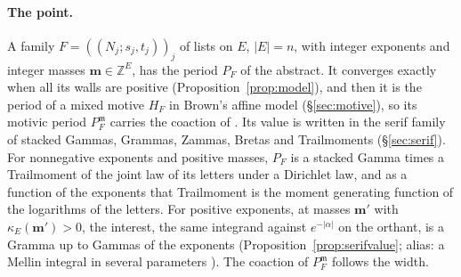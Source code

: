 \documentclass[11pt]{article}
\theoremstyle{plain}
\theoremstyle{definition}
\theoremstyle{remark}
\newcommand{\Z}{\mathbb Z}
\newcommand{\m}{\mathfrak m}
\newcommand{\bm}{\mathbf m}
\begin{document}
\paragraph{The point.} A family $F=((N_j;s_j,t_j))_j$ of lists on $E$, $|E|=n$, with integer exponents and integer masses $\bm\in\Z^E$, has the period $P_F$ of the abstract. It converges exactly when all its walls are positive (Proposition~\ref{prop:model}), and then it is the period of a mixed motive $H_F$ in Brown's affine model (\S\ref{sec:motive}), so its motivic period $P^{\m}_F$ carries the coaction of \cite{B1}. Its value is written in the serif family of stacked Gammas, Grammas, Zammas, Bretas and Trailmoments (\S\ref{sec:serif}). For nonnegative exponents and positive masses, $P_F$ is a stacked Gamma times a Trailmoment of the joint law of its letters under a Dirichlet law, and as a function of the exponents that Trailmoment is the moment generating function of the logarithms of the letters. For positive exponents, at masses $\bm'$ with $\kappa_E(\bm')>0$, the interest, the same integrand against $e^{-|\alpha|}$ on the orthant, is a Gramma up to Gammas of the exponents (Proposition~\ref{prop:serifvalue}; alias: a Mellin integral in several parameters \cite{B3}). The coaction of $P^{\m}_F$ follows the width.
\end{document}
